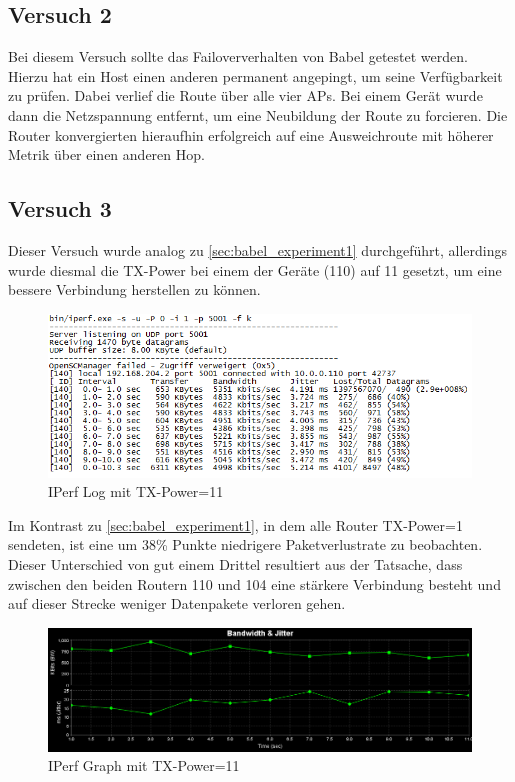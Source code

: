 \documentclass[10pt]{scrartcl}
\begin{document}
	
	\subsection{Versuch 2}
	Bei diesem Versuch sollte das Failoververhalten von Babel getestet werden. Hierzu hat ein Host einen anderen permanent angepingt, um seine Verfügbarkeit zu prüfen. Dabei verlief die Route über alle vier APs. Bei einem Gerät wurde dann die Netzspannung entfernt, um eine Neubildung der Route zu forcieren. Die Router konvergierten hieraufhin erfolgreich auf eine Ausweichroute mit höherer Metrik über einen anderen Hop.
	
	\subsection{Versuch 3}\label{sec:babel_experiment3}
	Dieser Versuch wurde analog zu \ref{sec:babel_experiment1} durchgeführt, allerdings wurde diesmal die TX-Power bei einem der Geräte (110) auf 11 gesetzt, um eine bessere Verbindung herstellen zu können.	

	\begin{figure}[H]
        \centering
                \includegraphics[width=\textwidth]{img/Babel_TX11_Protokoll}
        \caption{IPerf Log mit TX-Power=11}
        \label{img:babel_iperf_tx11}
	\end{figure}
	
Im Kontrast zu \ref{sec:babel_experiment1}, in dem alle Router TX-Power=1 sendeten, ist eine um 38\% Punkte niedrigere Paketverlustrate zu beobachten. Dieser Unterschied von gut einem Drittel resultiert aus der Tatsache, dass zwischen den beiden Routern 110 und 104 eine stärkere Verbindung besteht und auf dieser Strecke weniger Datenpakete verloren gehen.

	\begin{figure}[H]
        \centering
                \includegraphics[width=\textwidth]{img/4_UDP_Babel_TX1_10MB}
        \caption{IPerf Graph mit TX-Power=11}
        \label{img:babel_iperf_graph_tx11}
	\end{figure}
	
\end{document}

